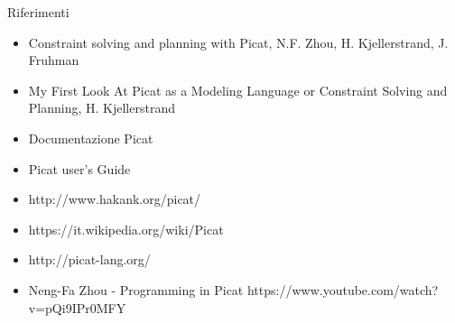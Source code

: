 \begin{frame}{Riferimenti}

	\begin{itemize}
		\item Constraint solving and planning with Picat, N.F. Zhou, H. Kjellerstrand, J. Fruhman
		\item My First Look At Picat as a Modeling Language or Constraint Solving and Planning, H. Kjellerstrand
		\item Documentazione Picat
		\item Picat user's Guide
		\item http://www.hakank.org/picat/
		\item https://it.wikipedia.org/wiki/Picat
		\item http://picat-lang.org/
		\item Neng-Fa Zhou - Programming in Picat https://www.youtube.com/watch?v=pQi9IPr0MFY
	\end{itemize}
	
\end{frame}